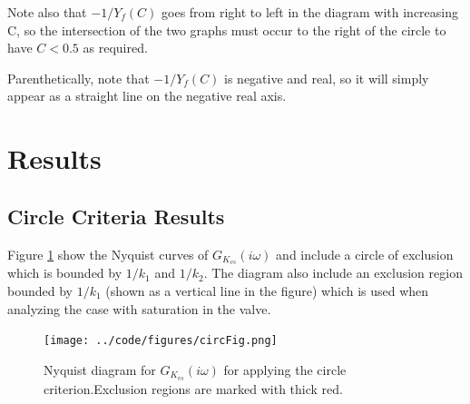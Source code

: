 \documentclass[a4paper, titlepage]{article}
\begin{document}
Note also that $-1/Y_{f}(C)$ goes from right to left in the diagram with increasing C, so the intersection of the two graphs must occur to the right of the circle to have $C < 0.5$ as required.

Parenthetically, note that $-1/Y_{f}(C)$ is negative and real, so it will simply appear as a straight line on the negative real axis. 


\section{Results}

\subsection{Circle Criteria Results}
Figure \ref{fig:circCrit} show the Nyquist curves of $G_{K_{vs}}(i\omega)$ and include a circle of exclusion which is bounded by $1/k_{1}$ and $1/k_{2}$.  The diagram also include an exclusion region bounded by $1/k_{1}$ (shown as a vertical line in the figure) which is used when analyzing the case with saturation in the valve.

\begin{figure}[H]
\center
\texttt{[image: ../code/figures/circFig.png]}
\caption{Nyquist diagram for $G_{K_{vs}}(i\omega)$ for applying the circle criterion.Exclusion regions are marked with thick red.}
\label{fig:circCrit}
\end{figure}

%
%
%
%
%
%
\end{document}
